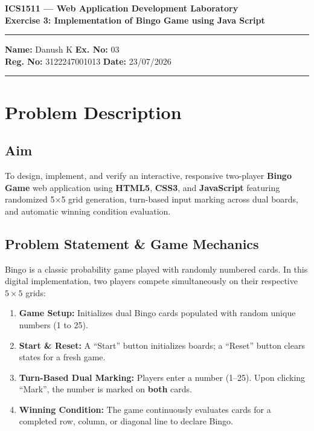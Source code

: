 \documentclass[11pt,a4paper]{article}
\begin{document}
\thispagestyle{plain}

\begin{center}
    {\large \textbf{ICS1511 --- Web Application Development Laboratory}}\\[0.2em]
    {\LARGE \textbf{Exercise 3: Implementation of Bingo Game using Java Script}}\\[0.4em]
    \rule{\textwidth}{0.8pt}
\end{center}

\vspace{-0.3em}

\noindent
\textbf{Name:} Danush K \hfill \textbf{Ex. No:} 03\\
\textbf{Reg. No:} 3122247001013 \hfill \textbf{Date:} 23/07/2026

\vspace{-0.4em}
\noindent\rule{\textwidth}{0.8pt}

\vspace{0.6em}

\section{Problem Description}

\subsection{Aim}
To design, implement, and verify an interactive, responsive two-player \textbf{Bingo Game} web application using \textbf{HTML5}, \textbf{CSS3}, and \textbf{JavaScript} featuring randomized 5$\times$5 grid generation, turn-based input marking across dual boards, and automatic winning condition evaluation.

\subsection{Problem Statement \& Game Mechanics}
Bingo is a classic probability game played with randomly numbered cards. In this digital implementation, two players compete simultaneously on their respective $5 \times 5$ grids:
\begin{enumerate}[leftmargin=*,itemsep=1pt,topsep=2pt]
    \item \textbf{Game Setup:} Initializes dual Bingo cards populated with random unique numbers (1 to 25).
    \item \textbf{Start \& Reset:} A ``Start'' button initializes boards; a ``Reset'' button clears states for a fresh game.
    \item \textbf{Turn-Based Dual Marking:} Players enter a number (1--25). Upon clicking ``Mark'', the number is marked on \textbf{both} cards.
    \item \textbf{Winning Condition:} The game continuously evaluates cards for a completed row, column, or diagonal line to declare Bingo.
\end{enumerate}
\end{document}
